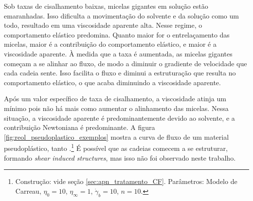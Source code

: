 			
			
			Sob taxas de cisalhamento baixas, micelas gigantes em solução estão emaranhadas. Isso dificulta a movimentação do solvente e da solução como um todo, resultado em uma viscosidade aparente alta. Nesse regime, o comportamento elástico predomina. Quanto maior for o entrelaçamento das micelas, maior é a contribuição do comportamento elástico, e maior é a viscosidade aparente. À medida que a taxa é aumentada, as micelas gigantes começam a se alinhar ao fluxo, de modo a diminuir o gradiente de velocidade que cada cadeia sente. Isso facilita o fluxo e diminui a estruturação que resulta no comportamento elástico, o que acaba diminuindo a viscosidade aparente.
			
			Após um valor específico de taxa de cisalhamento, a viscosidade atinja um mínimo pois não há mais como aumentar o alinhamento das micelas. Nessa situação, a viscosidade aparente é predominantemente devido ao solvente, e a contribuição Newtoniana é predominante. A figura \ref{fig:reol_pseudoplastico_exemplos} mostra a curva de fluxo de um material pseudoplástico, tanto .\footnote{Construção: vide seção \ref{sec:apn_tratamento_CF}. Parâmetros: Modelo de Carreau, \(\eta_0=10\), \(\eta_{\infty}=1\), \(\dot{\gamma}_b=10\), \(n=10\).} É possível que as cadeias comecem a se estruturar, formando \emph{shear induced structures}, mas isso não foi observado neste trabalho.
	
